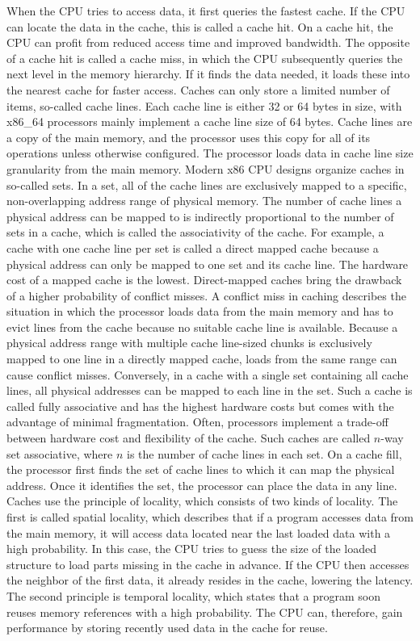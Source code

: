 When the CPU tries to access data, it first queries the fastest cache. If the
CPU can locate the data in the cache, this is called a cache hit. On a cache
hit, the CPU can profit from reduced access time and improved bandwidth. The
opposite of a cache hit is called a cache miss, in which the CPU subsequently
queries the next level in the memory hierarchy. If it finds the data needed, it
loads these into the nearest cache for faster access. Caches can only store a
limited number of items, so-called cache lines. Each cache line is either 32 or
64 bytes in size, with x86\_64 processors mainly implement a cache line size of
64 bytes. Cache lines are a copy of the main memory, and the processor uses this
copy for all of its operations unless otherwise configured. The processor loads
data in cache line size granularity from the main memory. Modern x86 CPU designs
organize caches in so-called sets. In a set, all of the cache lines are
exclusively mapped to a specific, non-overlapping address range of physical
memory. The number of cache lines a physical address can be mapped to is
indirectly proportional to the number of sets in a cache, which is called the
associativity of the cache. For example, a cache with one cache line per set is
called a direct mapped cache because a physical address can only be mapped to
one set and its cache line. The hardware cost of a mapped cache is the lowest.
Direct-mapped caches bring the drawback of a higher probability of conflict
misses. A conflict miss in caching describes the situation in which the
processor loads data from the main memory and has to evict lines from the cache
because no suitable cache line is available. Because a physical address range
with multiple cache line-sized chunks is exclusively mapped to one line in a
directly mapped cache, loads from the same range can cause conflict misses.
Conversely, in a cache with a single set containing all cache lines, all
physical addresses can be mapped to each line in the set. Such a cache is called
fully associative and has the highest hardware costs but comes with the
advantage of minimal fragmentation. Often, processors implement a trade-off
between hardware cost and flexibility of the cache. Such caches are called
$n$-way set associative, where $n$ is the number of cache lines in each set. On
a cache fill, the processor first finds the set of cache lines to which it can
map the physical address. Once it identifies the set, the processor can place
the data in any line. \\

Caches use the principle of locality, which consists of two kinds of locality.
The first is called spatial locality, which describes that if a program accesses
data from the main memory, it will access data located near the last loaded data
with a high probability. In this case, the CPU tries to guess the size of the
loaded structure to load parts missing in the cache in advance. If the CPU then
accesses the neighbor of the first data, it already resides in the cache,
lowering the latency. The second principle is temporal locality, which states
that a program soon reuses memory references with a high probability. The CPU
can, therefore, gain performance by storing recently used data in the cache for
reuse.\\

